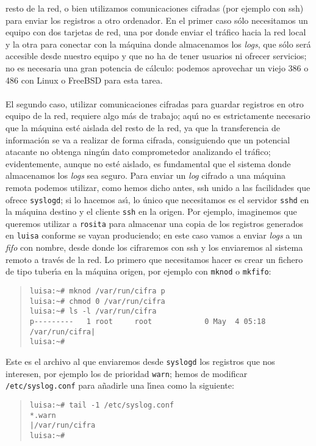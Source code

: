 resto de la red, o bien utilizamos comunicaciones cifradas (por ejemplo con
{\sc ssh}) para enviar los registros a otro ordenador. En el primer caso s\'olo
necesitamos un equipo con dos tarjetas de red, una por donde enviar el tr\'afico
hacia la red local y la otra para conectar con la m\'aquina donde almacenamos 
los {\it logs}, que s\'olo ser\'a accesible desde nuestro equipo y que no ha
de tener usuarios ni ofrecer servicios; no es necesaria una gran potencia de 
c\'alculo: podemos aprovechar un viejo 386 o 486 con Linux o FreeBSD para 
esta tarea.\\
\\El segundo caso, utilizar comunicaciones cifradas para guardar registros en
otro equipo de la red, requiere algo m\'as de trabajo; aqu\'{\i} no es 
estrictamente necesario que la m\'aquina est\'e aislada del resto de la red, ya 
que la
transferencia de informaci\'on se va a realizar de forma cifrada, consiguiendo
que un potencial atacante no obtenga ning\'un dato comprometedor analizando el
tr\'afico; evidentemente, aunque no est\'e aislado, es fundamental que el
sistema donde almacenamos los {\it logs} sea seguro. Para enviar un {\it log}
cifrado a una m\'aquina remota podemos utilizar, como hemos dicho antes, {\sc
ssh} unido a las facilidades que ofrece {\tt syslogd}; si lo hacemos as\'{\i},
lo \'unico que necesitamos es el servidor {\tt sshd} en la m\'aquina destino
y el cliente {\tt ssh} en la origen. Por ejemplo, imaginemos
que queremos utilizar a {\tt rosita} para almacenar una copia de los registros
generados en {\tt luisa} conforme se vayan produciendo; en este caso vamos a
enviar {\it logs} a un {\it fifo} con nombre, desde donde los cifraremos con 
{\sc ssh} y los enviaremos al sistema remoto a trav\'es de la red. Lo
primero que necesitamos hacer es crear un fichero de tipo tuber\'{\i}a en la
m\'aquina origen, por ejemplo con {\tt mknod} o {\tt mkfifo}:
\begin{quote}
\begin{verbatim}
luisa:~# mknod /var/run/cifra p
luisa:~# chmod 0 /var/run/cifra
luisa:~# ls -l /var/run/cifra
p---------   1 root     root            0 May  4 05:18 /var/run/cifra|
luisa:~# 
\end{verbatim}
\end{quote}
Este es el archivo al que enviaremos desde {\tt syslogd} los registros que nos
interesen, por ejemplo los de prioridad {\tt warn}; hemos de modificar {\tt
/etc/syslog.conf} para a\~nadirle una l\'{\i}nea como la siguiente:
\begin{quote}
\begin{verbatim}
luisa:~# tail -1 /etc/syslog.conf 
*.warn                                             |/var/run/cifra
luisa:~# 
\end{verbatim}
\end{quote}
